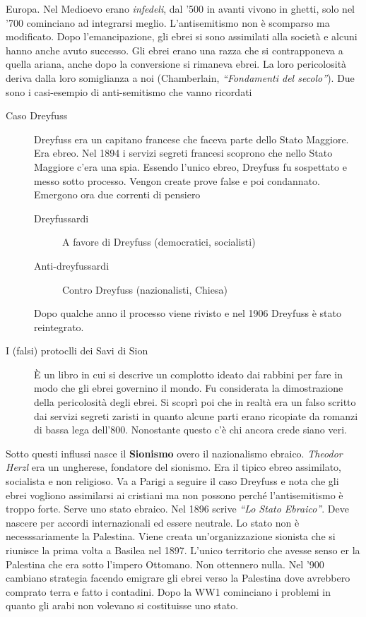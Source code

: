 Europa. Nel Medioevo erano \emph{infedeli}, dal '500 in avanti vivono in ghetti, solo nel '700 
cominciano ad integrarsi meglio. L'antisemitismo non è scomparso ma modificato. Dopo l'emancipazione,
gli ebrei si sono assimilati alla società e alcuni hanno anche avuto successo. Gli ebrei erano una
razza che si contrapponeva a quella ariana, anche dopo la conversione si rimaneva ebrei. La loro
pericolosità deriva dalla loro somiglianza a noi (Chamberlain, \emph{``Fondamenti del  
secolo''}).
Due sono i casi-esempio di anti-semitismo che vanno ricordati
\begin{description}
  \item[Caso Dreyfuss] Dreyfuss era un capitano francese che faceva parte dello Stato Maggiore. Era
    ebreo. Nel 1894 i servizi segreti francesi scoprono che nello Stato Maggiore c'era una spia.
    Essendo l'unico ebreo, Dreyfuss fu sospettato e messo sotto processo. Vengon create prove false
    e poi condannato. Emergono ora due correnti di pensiero
    \begin{description}
      \item[Dreyfussardi] A favore di Dreyfuss (democratici, socialisti)
      \item[Anti-dreyfussardi] Contro Dreyfuss (nazionalisti, Chiesa)
    \end{description}
    Dopo qualche anno il processo viene rivisto e nel 1906 Dreyfuss è stato reintegrato.
  \item[I (falsi) protoclli dei Savi di Sion] È un libro in cui si descrive un complotto ideato
    dai rabbini per fare in modo che gli ebrei governino il mondo. Fu considerata la dimostrazione
    della pericolosità degli ebrei. Si scoprì poi che in realtà era un falso scritto dai servizi
    segreti zaristi in quanto alcune parti erano ricopiate da romanzi di bassa lega dell'800.
    Nonostante questo c'è chi ancora crede siano veri.
\end{description}
Sotto questi influssi nasce il \textbf{Sionismo} overo il nazionalismo ebraico. 
\emph{Theodor Herzl} era un ungherese, fondatore del sionismo. Era il tipico ebreo assimilato, 
socialista e non religioso. Va a Parigi a seguire il caso Dreyfuss e nota che gli ebrei vogliono 
assimilarsi ai cristiani ma non possono perché l'antisemitismo è troppo forte. Serve uno stato 
ebraico. Nel 1896 scrive \emph{``Lo Stato Ebraico''}. Deve nascere per accordi internazionali ed 
essere neutrale. Lo stato non è necesssariamente la Palestina. Viene creata un'organizzazione 
sionista che si riunisce la prima volta a Basilea nel 1897. L'unico territorio che avesse senso er
la Palestina che era sotto l'impero Ottomano. Non ottennero nulla. Nel '900 cambiano strategia 
facendo emigrare gli ebrei verso la Palestina dove avrebbero comprato terra e fatto i contadini. 
Dopo la WW1 cominciano i problemi in quanto gli arabi non volevano si costituisse uno stato.

